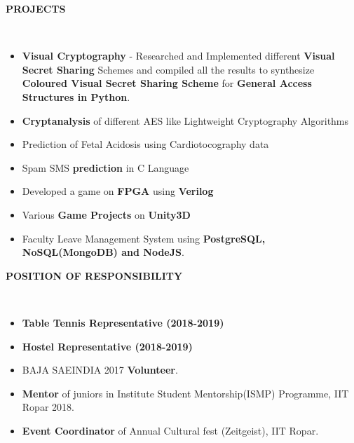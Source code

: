 \documentclass[a4paper,10pt]{article}
\newcommand{\lsep}{-0.6cm}
\newcommand{\resheading}[1]{{\small \colorbox{mygrey}{\begin{minipage}{0.975\textwidth}{\textbf{#1 \vphantom{p\^{E}}}}\end{minipage}}}}
\begin{document}
\resheading{\textbf{PROJECTS} }\\[\lsep]
\vspace{2.0pt}
\begin{itemize}
\setlength{\itemsep}{1pt}
\setlength{\parskip}{0pt}
\setlength{\parsep}{0pt}
\item \textbf{Visual Cryptography} - Researched and Implemented different \textbf{Visual Secret Sharing} Schemes and compiled all the results to synthesize \textbf{Coloured Visual Secret Sharing Scheme} for \textbf{General Access Structures in Python}.
\item \textbf{Cryptanalysis} of different AES like Lightweight Cryptography Algorithms
\item Prediction of Fetal Acidosis using Cardiotocography data
\item Spam SMS \textbf{prediction} in C Language
\item Developed a game on \textbf{FPGA} using \textbf{Verilog}
\item Various \textbf{Game Projects} on \textbf{Unity3D}
\item Faculty Leave Management System using \textbf{PostgreSQL, NoSQL(MongoDB) and NodeJS}.
\end{itemize}


\resheading{\textbf{POSITION OF RESPONSIBILITY} }\\[\lsep]
\vspace{2.0pt}
\begin{itemize}
\setlength{\itemsep}{1pt}
\setlength{\parskip}{0pt}
\setlength{\parsep}{0pt}
\item \textbf{Table Tennis Representative (2018-2019)}
\item \textbf{Hostel Representative (2018-2019)}
\item BAJA SAEINDIA 2017 \textbf{Volunteer}.
\item \textbf{Mentor} of juniors in Institute Student Mentorship(ISMP) Programme, IIT Ropar 2018.
\item \textbf{Event Coordinator} of Annual Cultural fest (Zeitgeist), IIT Ropar. 
\end{itemize}
\end{document}
